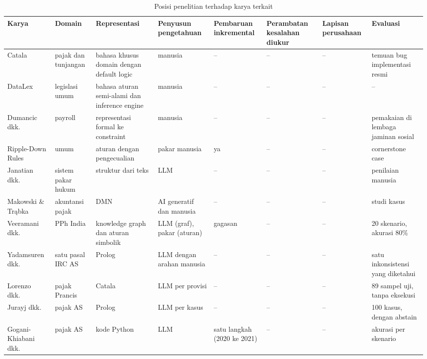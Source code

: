 \documentclass[conference]{IEEEtran}
\makeatletter
\DeclareRobustCommand{\en}[1]{{\usefont{\f@encoding}{\f@family}{\f@series}{it}#1\/}}
\makeatother
\begin{document}
\begin{table}[t]
\centering
\caption{Posisi penelitian terhadap karya terkait}
\label{tab:posisi}
\scriptsize
\begin{tabularx}{\textwidth}{@{}P{2.9cm} P{1.9cm} L P{1.9cm} P{1.4cm} P{1.5cm} P{1.3cm} P{2.3cm}@{}}
\toprule
\textbf{Karya} & \textbf{Domain} & \textbf{Representasi} & \textbf{Penyusun pengetahuan} & \textbf{Pembaruan inkremental} & \textbf{Perambatan kesalahan diukur} & \textbf{Lapisan perusahaan} & \textbf{Evaluasi} \\
\midrule
Catala~\cite{merigoux2021catala,huttner2022catala} & pajak dan tunjangan & bahasa khusus domain dengan \en{default logic} & manusia & -- & -- & -- & temuan \en{bug} implementasi resmi \\
DataLex~\cite{mowbray2023scaling,mowbray2023xai} & legislasi umum & bahasa aturan semi-alami dan \en{inference engine} & manusia & -- & -- & -- & -- \\
Dumancic dkk.~\cite{dumancic2021payroll} & \en{payroll} & representasi formal ke \en{constraint} & manusia & -- & -- & -- & pemakaian di lembaga jaminan sosial \\
\en{Ripple-Down Rules}~\cite{compton2021rdr} & umum & aturan dengan pengecualian & pakar manusia & ya & -- & -- & \en{cornerstone case} \\
Janatian dkk.~\cite{janatian2023texttostructure} & sistem pakar hukum & struktur dari teks & LLM & -- & -- & -- & penilaian manusia \\
Makowski \& Tr\k{a}bka~\cite{makowski2025dmn} & akuntansi pajak & DMN & AI generatif dan manusia & -- & -- & -- & studi kasus \\
Veeramani dkk.~\cite{veeramani2026neurosymbolic} & PPh India & \en{knowledge graph} dan aturan simbolik & LLM (graf), pakar (aturan) & gagasan & -- & -- & 20 skenario, akurasi 80\% \\
Yadamsuren dkk.~\cite{yadamsuren2026formalization} & satu pasal IRC AS & Prolog & LLM dengan arahan manusia & -- & -- & -- & satu inkonsistensi yang diketahui \\
Lorenzo dkk.~\cite{lorenzo2025translating} & pajak Prancis & Catala & LLM per provisi & -- & -- & -- & 89 sampel uji, tanpa eksekusi \\
Jurayj dkk.~\cite{jurayj2026tax} & pajak AS & Prolog & LLM per kasus & -- & -- & -- & 100 kasus, dengan \en{abstain} \\
Gogani-Khiabani dkk.~\cite{goganikhiabani2025maintaining} & pajak AS & kode Python & LLM & satu langkah (2020 ke 2021) & -- & -- & akurasi per skenario \\

\end{tabularx}
\end{table}
\end{document}
